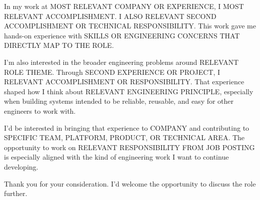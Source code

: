 In my work at MOST RELEVANT COMPANY OR EXPERIENCE, I MOST RELEVANT ACCOMPLISHMENT. I ALSO RELEVANT SECOND ACCOMPLISHMENT OR TECHNICAL RESPONSIBILITY. This work gave me hands-on experience with SKILLS OR ENGINEERING CONCERNS THAT DIRECTLY MAP TO THE ROLE.

I'm also interested in the broader engineering problems around RELEVANT ROLE THEME. Through SECOND EXPERIENCE OR PROJECT, I RELEVANT ACCOMPLISHMENT OR RESPONSIBILITY. That experience shaped how I think about RELEVANT ENGINEERING PRINCIPLE, especially when building systems intended to be reliable, reusable, and easy for other engineers to work with.

I'd be interested in bringing that experience to COMPANY and contributing to SPECIFIC TEAM, PLATFORM, PRODUCT, OR TECHNICAL AREA. The opportunity to work on RELEVANT RESPONSIBILITY FROM JOB POSTING is especially aligned with the kind of engineering work I want to continue developing.

%
Thank you for your consideration. I'd welcome the opportunity to discuss the role further.

\vspace{10pt}
\LetterSignoff\\[4pt]
\YourName



